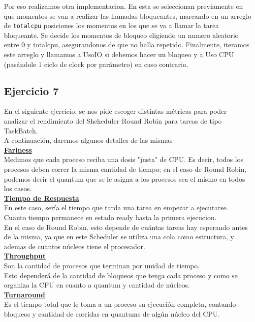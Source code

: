Por eso realizamos otra implementacion. En esta se seleccionan previamente en que momentos se van a realizar las llamadas bloqueantes, marcando en un arreglo de \verb|totalcpu| 
posiciones los momentos en los que se va a llamar la tarea bloqueante. Se decide los momentos de bloqueo eligiendo un numero aleatorio entre 0 y totalcpu, 
asegurandonos de que no halla repetido. 
Finalmente, iteramos este arreglo y llamamos a UsoIO si debemos hacer un bloqueo y a Uso CPU (pas\'andole 1 ciclo de clock por par\'ametro) en caso contrario.

\subsection{Ejercicio 7}
En el siguiente ejercicio, se nos pide escoger distintas m\'etricas para poder analizar el rendimiento del Shcheduler Round Robin para tareas de tipo TaskBatch.\\
A continuaci\'on, daremos algunos detalles de las mismas\\

\textbf{\underline{Fariness}}\\
Medimos que cada proceso reciba una dosis "justa" de CPU. Es decir, todos los procesos deben correr la misma cantidad de tiempo; en el caso de Round Robin, podemos decir el quantum que se le asigna a los procesos sea el mismo en todos los casos.\\

\textbf{\underline{Tiempo de Respuesta}}\\
En este caso, ser\'ia el tiempo que tarda una tarea en empezar a ejecutarse.
Cuanto tiempo permanece en estado ready hasta la primera ejecucion.\\
En el caso de Round Robin, esto depende de cu\'antas tareas hay esperando antes de la misma, ya que en este Scheduler se utiliza una cola como estructura, y ademas de cuantos n\'ucleos tiene el procesador.\\

\textbf{\underline{Throughput}}\\
Son la cantidad de procesos que terminan por unidad de tiempo.\\
Esto depender\'a de la cantidad de bloqueos que tenga cada proceso y como se organiza la CPU en cuanto a quantum y cantidad de n\'ucleos.\\

\textbf{\underline{Turnaround}}\\
Es el tiempo total que le toma a un proceso su ejecuci\'on completa, contando bloqueos y cantidad de corridas en quantums de alg\'un n\'ucleo del CPU.\\

